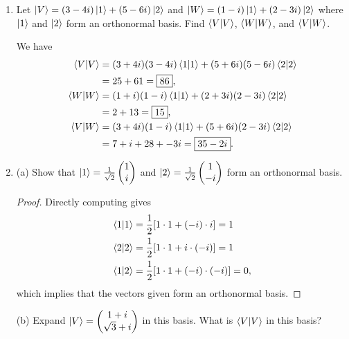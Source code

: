 \documentclass[11pt]{article}
\begin{document}
\begin{enumerate}[label=24.\arabic*]
    \item Let $\ket{V} = (3-4i)\ket{1} + (5-6i)\ket{2}$ and $\ket{W} = (1-i)\ket{1} + (2-3i)\ket{2}$ where $\ket{1}$ and $\ket{2}$ form an orthonormal basis. Find $\bra{V}\ket{V}$, $\bra{W}\ket{W}$, and $\bra{V}\ket{W}$.
    
    We have \begin{align*}
        \bra{V}\ket{V} &= (3+4i)(3-4i)\bra{1}\ket{1} + (5+6i)(5-6i)\bra{2}\ket{2}\\
        &= 25 + 61 = \boxed{86},\\
        \bra{W}\ket{W} &= (1+i)(1-i)\bra{1}\ket{1} + (2+3i)(2-3i)\bra{2}\ket{2}\\
        &= 2 + 13 = \boxed{15},\\
        \bra{V}\ket{W} &= (3+4i)(1-i)\bra{1}\ket{1} + (5+6i)(2-3i)\bra{2}\ket{2}\\
        &= 7 + i + 28 + -3i = \boxed{35 - 2i}.
    \end{align*}
    \item (a) Show that $\ket{1} = \frac{1}{\sqrt{2}}\begin{pmatrix}
        1 \\ i
    \end{pmatrix}$ and $\ket{2} = \frac{1}{\sqrt{2}}\begin{pmatrix}
        1\\ -i
    \end{pmatrix}$ form an orthonormal basis.
    \begin{proof}
        Directly computing gives \begin{align*}
            \bra{1}\ket{1} &= \frac{1}{2}[1\cdot 1 + (-i)\cdot i] = 1\\
            \bra{2}\ket{2} &= \frac{1}{2}[1\cdot 1 + i\cdot (-i)] = 1\\
            \bra{1}\ket{2} &= \frac{1}{2}[1\cdot 1 + (-i)\cdot (-i)] = 0,
        \end{align*} which implies that the vectors given form an orthonormal basis.
    \end{proof}
    (b) Expand $\ket{V} = \begin{pmatrix}
        1+i \\ \sqrt{3} + i
    \end{pmatrix}$ in this basis. What is $\bra{V}\ket{V}$ in this basis?


\end{enumerate}
\end{document}
